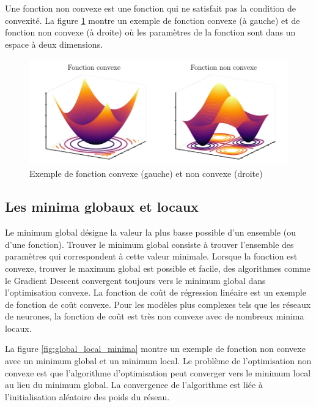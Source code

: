 Une fonction non convexe est une fonction qui ne satisfait pas la condition de convexité. La figure \ref{fig:convex-nonconvex-functions} montre un exemple de fonction convexe (à gauche) et de fonction non convexe (à droite) où les paramètres de la fonction sont dans un espace à deux dimensions.

\begin{figure}[h]
    \centering
    \includegraphics{figures/gradient_descent_fr.pdf}
    \caption{Exemple de fonction convexe (gauche) et non convexe (droite)}
    \label{fig:convex-nonconvex-functions}
\end{figure}


\subsection{Les minima globaux et locaux}
Le minimum global désigne la valeur la plus basse possible d'un ensemble (ou d'une fonction). Trouver le minimum global consiste à trouver l'ensemble des paramètres qui correspondent à cette valeur minimale. Lorsque la fonction est convexe, trouver le maximum global est possible et facile, des algorithmes comme le Gradient Descent convergent toujours vers le minimum global dans l'optimisation convexe. La fonction de coût de régression linéaire est un exemple de fonction de coût convexe. Pour les modèles plus complexes tels que les réseaux de neurones, la fonction de coût est très non convexe avec de nombreux minima locaux.

La figure \ref{fig:global_local_minima} montre un exemple de fonction non convexe avec un minimum global et un minimum local. Le problème de l'optimisation non convexe est que l'algorithme d'optimisation peut converger vers le minimum local au lieu du minimum global. La convergence de l'algorithme est liée à l'initialisation aléatoire des poids du réseau.

